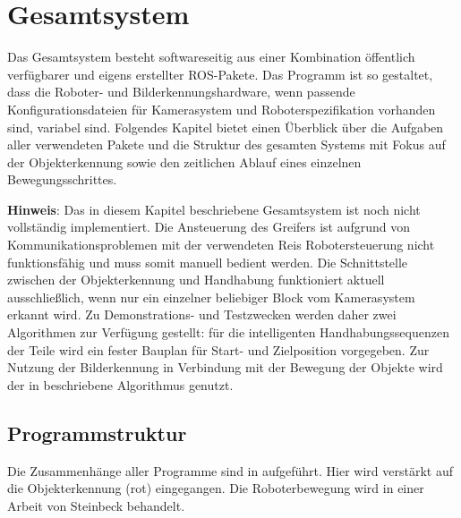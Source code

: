 \chapter{Gesamtsystem}

Das Gesamtsystem besteht softwareseitig aus einer Kombination öffentlich verfügbarer und eigens erstellter \ac{ROS}-Pakete. Das Programm ist so gestaltet, dass die Roboter- und Bilderkennungshardware, wenn passende Konfigurationsdateien für Kamerasystem und Roboterspezifikation vorhanden sind, variabel sind. Folgendes Kapitel bietet einen Überblick über die Aufgaben aller verwendeten Pakete und die Struktur des gesamten Systems mit Fokus auf der Objekterkennung sowie den zeitlichen Ablauf eines einzelnen Bewegungsschrittes.

\textbf{Hinweis}: Das in diesem Kapitel beschriebene Gesamtsystem ist noch nicht vollständig implementiert. Die Ansteuerung des Greifers ist aufgrund von Kommunikationsproblemen mit der verwendeten Reis Robotersteuerung nicht funktionsfähig und muss somit manuell bedient werden. Die Schnittstelle zwischen der Objekterkennung und Handhabung funktioniert aktuell ausschließlich, wenn nur ein einzelner beliebiger Block vom Kamerasystem erkannt wird. Zu Demonstrations- und Testzwecken werden daher zwei Algorithmen zur Verfügung gestellt: für die intelligenten Handhabungssequenzen der Teile wird ein fester Bauplan für Start- und Zielposition vorgegeben\aus.
Zur Nutzung der Bilderkennung in Verbindung mit der Bewegung der Objekte wird der in  beschriebene Algorithmus genutzt.


\section{Programmstruktur} \label{sec:programmstruktur}

Die Zusammenhänge aller Programme sind in  aufgeführt. Hier wird verstärkt auf die Objekterkennung (rot) eingegangen. Die Roboterbewegung wird in einer Arbeit von Steinbeck \cite[Abschnitt~4.1]{steinbeck_entwicklung_2022} behandelt.

